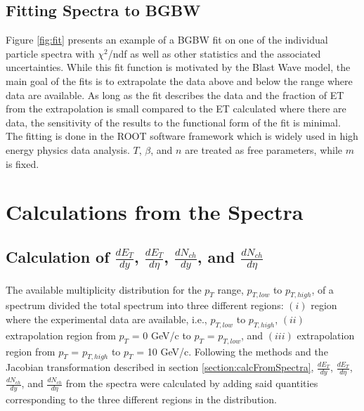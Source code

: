 \subsection{Fitting Spectra to BGBW}
Figure \ref{fig:fit} presents an example of a BGBW fit on one of the individual particle spectra with $\chi^{2}$/ndf as well as other statistics and the associated uncertainties. While this fit function is motivated by the Blast Wave model, the main goal of the fits is to extrapolate the data above and below the range where data are available. As long as the fit describes the data and the fraction of ET from the extrapolation is small compared to the ET calculated where there are data, the sensitivity of the results to the functional form of the fit is minimal. The fitting is done in the ROOT software framework which is widely used in high energy physics data analysis. $T$, $\beta$, and $n$ are treated as free parameters, while $m$ is fixed.
\section{Calculations from the Spectra}

\subsection{Calculation of $\frac{dE_{T}}{dy}$, $\frac{dE_{T}}{d\eta}$, $\frac{dN_{ch}}{dy}$, and $\frac{dN_{ch}}{d\eta}$}
The available multiplicity distribution for the $p_{T}$ range, $p_{T,low}$ to $p_{T,high}$, of a spectrum divided the total spectrum into three different regions: $(i)$ region where the experimental data are available, i.e., $p_{T,low}$ to $p_{T,high}$, $(ii)$ extrapolation region from $p_{T}$ = 0 GeV/c to $p_{T}$ = $p_{T,low}$, and $(iii)$ extrapolation region from $p_{T}$ = $p_{T,high}$ to $p_{T}$ = 10 GeV/c. Following the methods and the Jacobian transformation described in section \ref{section:calcFromSpectra}, $\frac{dE_{T}}{dy}$, $\frac{dE_{T}}{d\eta}$, $\frac{dN_{ch}}{dy}$, and $\frac{dN_{ch}}{d\eta}$ from the spectra were calculated by adding said quantities corresponding to the three different regions in the distribution.

